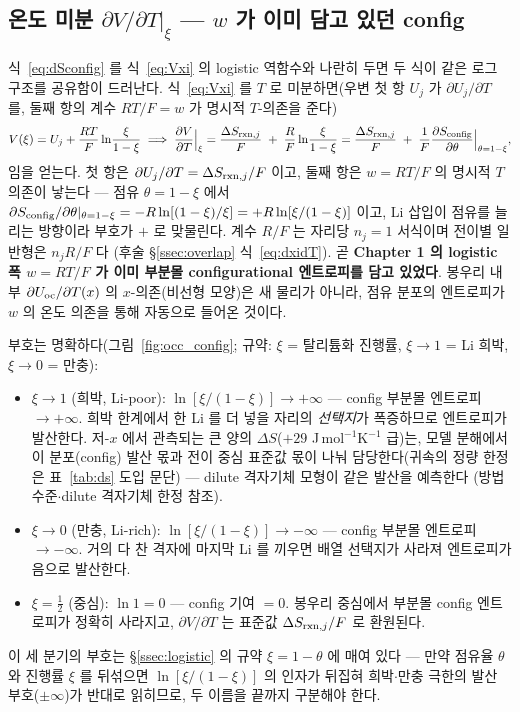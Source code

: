 \subsection{온도 미분 $\partial V/\partial T|_\xi$ --- $w$ 가 이미 담고 있던 config}\label{ssec:dvdt}
식~\eqref{eq:dSconfig} 를 식~\eqref{eq:Vxi} 의 logistic 역함수와 나란히 두면 두 식이 같은 로그 구조를 공유함이
드러난다. 식~\eqref{eq:Vxi} 를 $T$ 로 미분하면(우변 첫 항 $U_j$ 가 $\partial U_j/\partial T$ 를, 둘째 항의
계수 $RT/F=w$ 가 명시적 $T$-의존을 준다)
\begin{equation}
V(\xi)=U_j+\frac{RT}{F}\ln\!\frac{\xi}{1-\xi}
\;\Longrightarrow\;
\frac{\partial V}{\partial T}\Big|_\xi
= \frac{\Delta S_{\mathrm{rxn},j}}{F}\;+\;\frac{R}{F}\ln\!\frac{\xi}{1-\xi}
= \frac{\Delta S_{\mathrm{rxn},j}}{F}\;+\;\frac{1}{F}\frac{\partial S_{\mathrm{config}}}{\partial\theta}\Big|_{\theta=1-\xi},
\label{eq:dVdT_config}
\end{equation}
임을 얻는다. 첫 항은 $\partial U_j/\partial T=\Delta S_{\mathrm{rxn},j}/F$ 이고, 둘째 항은 $w=RT/F$ 의 명시적 $T$
의존이 낳는다 --- 점유 $\theta=1-\xi$ 에서
$\partial S_{\mathrm{config}}/\partial\theta|_{\theta=1-\xi}=-R\ln[(1-\xi)/\xi]=+R\ln[\xi/(1-\xi)]$ 이고, Li 삽입이 점유를
늘리는 방향이라 부호가 $+$ 로 맞물린다. 계수 $R/F$ 는 자리당 $n_j{=}1$ 서식이며 전이별 일반형은 $n_jR/F$ 다
(후술 \S\ref{ssec:overlap} 식~\eqref{eq:dxidT}). 곧 \textbf{Chapter 1 의 logistic 폭 $w=RT/F$ 가 이미 부분몰
configurational 엔트로피를 담고 있었다}. 봉우리 내부 $\partial U_{\mathrm{oc}}/\partial T(x)$ 의 $x$-의존(비선형 모양)은
새 물리가 아니라, 점유 분포의 엔트로피가 $w$ 의 온도 의존을 통해 자동으로 들어온 것이다.

부호는 명확하다(그림~\ref{fig:occ_config}; 규약: $\xi$ = 탈리튬화 진행률, $\xi\to1$ = Li 희박, $\xi\to0$ = 만충):
\begin{itemize}[leftmargin=1.4em,itemsep=1pt]
\item $\xi\to1$ (희박, Li-poor): $\ln[\xi/(1-\xi)]\to+\infty$ --- config 부분몰 엔트로피 $\to+\infty$. 희박
한계에서 한 Li 를 더 넣을 자리의 \emph{선택지}가 폭증하므로 엔트로피가 발산한다. 저-$x$ 에서 관측되는 큰 양의
$\Delta S$($+29$ J\,mol$^{-1}$K$^{-1}$ 급)는, 모델 분해에서 이 분포(config) 발산 몫과 전이 중심 표준값 몫이
나눠 담당한다(귀속의 정량 한정은 표~\ref{tab:ds} 도입 문단) --- dilute 격자기체 모형이 같은 발산을 예측한다
\cite{occupation2019}(방법 수준$\cdot$dilute 격자기체 한정 참조).
\item $\xi\to0$ (만충, Li-rich): $\ln[\xi/(1-\xi)]\to-\infty$ --- config 부분몰 엔트로피 $\to-\infty$. 거의 다 찬
격자에 마지막 Li 를 끼우면 배열 선택지가 사라져 엔트로피가 음으로 발산한다.
\item $\xi=\tfrac12$ (중심): $\ln 1=0$ --- config 기여 $=0$. 봉우리 중심에서 부분몰 config 엔트로피가 정확히
사라지고, $\partial V/\partial T$ 는 표준값 $\Delta S_{\mathrm{rxn},j}/F$ 로 환원된다.
\end{itemize}
이 세 분기의 부호는 \S\ref{ssec:logistic} 의 규약 $\xi=1-\theta$ 에 매여 있다 --- 만약 점유율 $\theta$ 와
진행률 $\xi$ 를 뒤섞으면 $\ln[\xi/(1-\xi)]$ 의 인자가 뒤집혀 희박$\cdot$만충 극한의 발산 부호($\pm\infty$)가
반대로 읽히므로, 두 이름을 끝까지 구분해야 한다.

